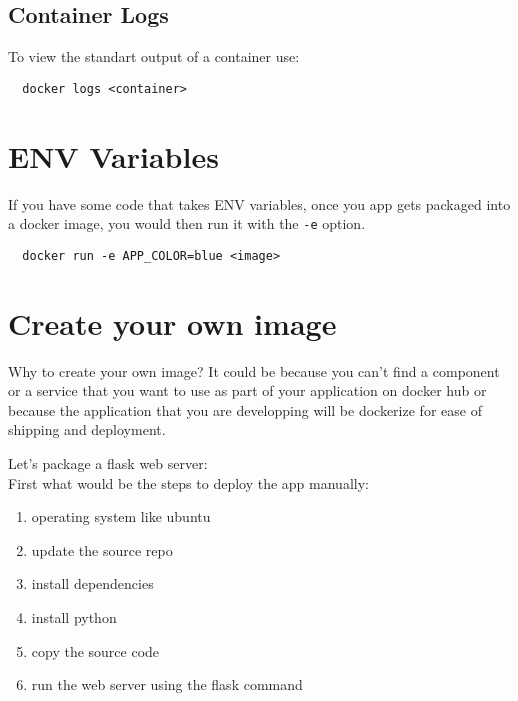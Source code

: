 \documentclass[french]{article}
\begin{document}
\subsection{Container Logs}

To view the standart output of a container use:
\begin{verbatim}
  docker logs <container>
\end{verbatim}

\section{ENV Variables}

If you have some code that takes ENV variables, once you app gets packaged into a docker image, you would then run it with the \verb|-e| option.
\begin{verbatim}
  docker run -e APP_COLOR=blue <image>
\end{verbatim}

\section{Create your own image}

Why to create your own image? It could be because you can't find a component or a service that you want to use as part of your application on docker hub or because the application that you are developping will be dockerize for ease of shipping and deployment.

Let's package a flask web server:\\
First what would be the steps to deploy the app manually:
\begin{enumerate}
  \item  operating system like ubuntu
  \item update the source repo
  \item install dependencies
  \item install python
  \item copy the source code
  \item run the web server using the flask command 
\end{enumerate}
\end{document}
